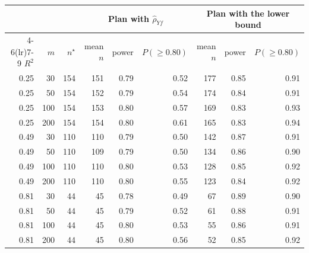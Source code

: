 \begin{tabular}{rrrrrrrrr}
\toprule
 & & & \multicolumn{3}{c}{Plan with $\hat\rho_{Yf}$} & \multicolumn{3}{c}{Plan with the lower bound} \\
\cmidrule(lr){4-6}\cmidrule(lr){7-9}
$R^2$ & $m$ & $n^\star$ & mean $n$ & power & $P(\geq 0.80)$ & mean $n$ & power & $P(\geq 0.80)$ \\
\midrule
0.25 & 30 & 154 & 151 & 0.79 & 0.52 & 177 & 0.85 & 0.91 \\
0.25 & 50 & 154 & 152 & 0.79 & 0.54 & 174 & 0.84 & 0.91 \\
0.25 & 100 & 154 & 153 & 0.80 & 0.57 & 169 & 0.83 & 0.93 \\
0.25 & 200 & 154 & 154 & 0.80 & 0.61 & 165 & 0.83 & 0.94 \\
0.49 & 30 & 110 & 110 & 0.79 & 0.50 & 142 & 0.87 & 0.91 \\
0.49 & 50 & 110 & 109 & 0.79 & 0.50 & 134 & 0.86 & 0.90 \\
0.49 & 100 & 110 & 110 & 0.80 & 0.53 & 128 & 0.85 & 0.92 \\
0.49 & 200 & 110 & 110 & 0.80 & 0.55 & 123 & 0.84 & 0.92 \\
0.81 & 30 & 44 & 45 & 0.78 & 0.49 & 67 & 0.89 & 0.90 \\
0.81 & 50 & 44 & 45 & 0.79 & 0.52 & 61 & 0.88 & 0.91 \\
0.81 & 100 & 44 & 45 & 0.80 & 0.53 & 55 & 0.86 & 0.91 \\
0.81 & 200 & 44 & 45 & 0.80 & 0.56 & 52 & 0.85 & 0.92 \\
\bottomrule
\end{tabular}
